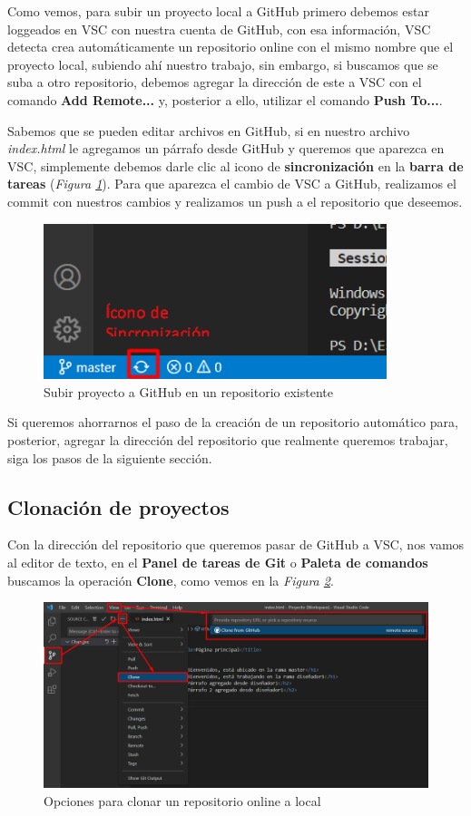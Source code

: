 Como vemos, para subir un proyecto local a GitHub primero debemos estar loggeados en VSC con nuestra cuenta de GitHub, con esa información, VSC detecta crea automáticamente un repositorio online con el mismo nombre que el proyecto local, subiendo ahí nuestro trabajo, sin embargo, si buscamos que se suba a otro repositorio, debemos agregar la dirección de este a VSC con el comando \textbf{Add Remote...} y, posterior a ello, utilizar el comando \textbf{Push To...}.

Sabemos que se pueden editar archivos en GitHub, si en nuestro archivo \textit{index.html} le agregamos un párrafo desde GitHub y queremos que aparezca en VSC, simplemente debemos darle clic al icono de \textbf{sincronización} en la \textbf{barra de tareas} (\textit{Figura \ref{fig: 32}}). Para que aparezca el cambio de VSC a GitHub, realizamos el commit con nuestros cambios y realizamos un push a el repositorio que deseemos.
\begin{figure}[H]
    \centering
    \caption{Subir proyecto a GitHub en un repositorio existente}
    \label{fig: 32}
    \includegraphics[width=10cm]{capturas/sincronizacion.png}
\end{figure}

Si queremos ahorrarnos el paso de la creación de un repositorio automático para, posterior, agregar la dirección del repositorio que realmente queremos trabajar, siga los pasos de la siguiente sección.


\subsection{Clonación de proyectos}

Con la dirección del repositorio que queremos pasar de GitHub a VSC, nos vamos al editor de texto, en el \textbf{Panel de tareas de Git} o \textbf{Paleta de comandos} buscamos la operación \textbf{Clone}, como vemos en la \textit{Figura \ref{fig: 33}}.
\begin{figure}[H]
    \centering
    \caption{Opciones para clonar un repositorio online a local}
    \label{fig: 33}
    \includegraphics[width=13cm]{capturas/clone.png}
\end{figure}

